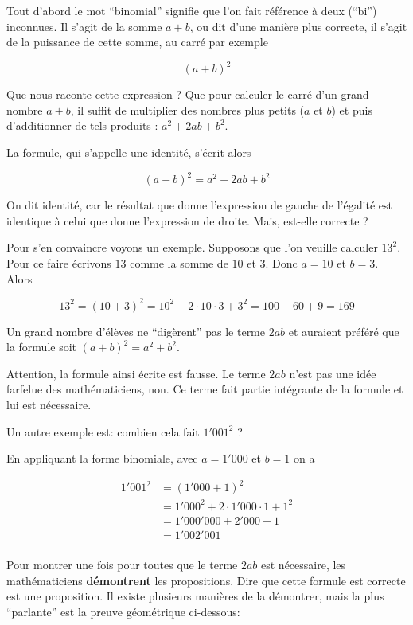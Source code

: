 \documentclass[
  12pt,
]{book}
\begin{document}
Tout d'abord le mot ``binomial'' signifie que l'on fait référence à deux (``bi'') inconnues. Il s'agit de la somme \(a+b\), ou dit d'une manière plus correcte, il s'agit de la puissance de cette somme, au carré par exemple

\[(a+b)^2\]

Que nous raconte cette expression ? Que pour calculer le carré d'un grand nombre \(a+b\), il suffit de multiplier des nombres plus petits (\(a\) et \(b\)) et puis d'additionner de tels produits : \(a^2+2ab+b^2\).

La formule, qui s'appelle une identité, s'écrit alors

\[(a+b)^2 = a^2+2ab+b^2\]

On dit identité, car le résultat que donne l'expression de gauche de l'égalité est identique à celui que donne l'expression de droite. Mais, est-elle correcte ?

Pour s'en convaincre voyons un exemple. Supposons que l'on veuille calculer \(13^2\). Pour ce faire écrivons \(13\) comme la somme de \(10\) et \(3\). Donc \(a=10\) et \(b=3\). Alors

\[13^2 = (10+3)^2=10^2+2\cdot 10\cdot 3+3^2= 100 + 60 + 9= 169\]

Un grand nombre d'élèves ne ``digèrent'' pas le terme \(2ab\) et auraient préféré que la formule soit \((a+b)^2=a^2 + b^2\).

Attention, la formule ainsi écrite est fausse. Le terme \(2ab\) n'est pas une idée farfelue des mathématiciens, non. Ce terme fait partie intégrante de la formule et lui est nécessaire.

Un autre exemple est: combien cela fait \(1'001^2\) ?

En appliquant la forme binomiale, avec \(a=1'000\) et \(b=1\) on a

\begin{align*}
1'001^2 & =(1'000 + 1)^2 \\ & = 1'000^2 +2\cdot 1'000\cdot 1 + 1^2 \\ & = 1'000'000+2'000+1 \\ &=1'002'001\\
\end{align*}

Pour montrer une fois pour toutes que le terme \(2ab\) est nécessaire, les mathématiciens \textbf{démontrent} les propositions. Dire que cette formule est correcte est une proposition. Il existe plusieurs manières de la démontrer, mais la plus ``parlante'' est la preuve géométrique ci-dessous:
\end{document}
